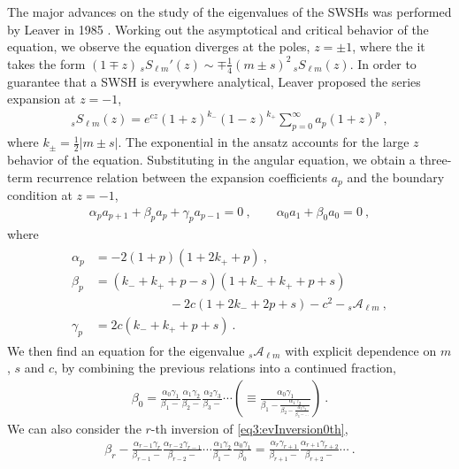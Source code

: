The major advances on the study of the eigenvalues of the SWSHs was performed by Leaver in 1985 . Working out the asymptotical and critical behavior of the equation, we observe the equation diverges at the poles, $z = \pm 1$, where the it takes the form $(1 \mp z) \,{}_{s}S_{\ell m}{}'(z) \sim \mp \tfrac{1}{4} (m \pm s)^2 \, {}_{s}S_{\ell m}(z)$. In order to guarantee that a SWSH is everywhere analytical, Leaver proposed the series expansion at $z=-1$,
\begin{align}
    \label{eq3:SWSHseriesLeaver}
    {}_{s}S_{\ell m}(z) = e^{c z} (1+z)^{k_-} (1-z)^{k_+} \sum_{p=0}^\infty a_p (1+z)^p ~,
\end{align}
where $k_{\pm} = \tfrac{1}{2}|m \pm s|$.
The exponential in the ansatz accounts for the large $z$ behavior of the equation.
Substituting in the angular equation, we obtain a three-term recurrence relation between the expansion coefficients $a_p$ and the boundary condition at $z=-1$,
\begin{align}
    \label{eq3:ap3CoefRecursion}
    \alpha_p a_{p+1} + \beta_p a_p + \gamma_p a_{p-1} = 0 ~,\qquad
    \alpha_0 a_1 + \beta_0 a_0 = 0 ~,
\end{align}
where
\begin{align}
    \label{eq3:LeaverCoefRecursion}
    \begin{split}
        \alpha_p &= -2 (1 + p) (1 + 2 k_{+} + p) ~,\\
        \beta_p  &= (k_{-} + k_{+} + p - s) (1 + k_{-} + k_{+} + p + s) \\
        &\qquad\qquad\qquad - 2 c (1 + 2 k_{-} + 2 p + s) - c^2 - {}_{s}\mathscr{A}_{\ell m} ~,\\
        \gamma_p &= 2 c (k_{-} + k_{+} + p + s) ~.
    \end{split}
\end{align}
We then find an equation for the eigenvalue ${}_{s}\mathscr{A}_{\ell m}$ with explicit dependence on $m$, $s$ and $c$, by combining the previous relations into a continued fraction,
\begin{align}
    \label{eq3:evInversion0th}
    \beta_0 = \frac{\alpha_0 \gamma_1}{\beta_1 -} \frac{\alpha_1 \gamma_2}{\beta_2 -} \frac{\alpha_2 \gamma_3}{\beta_3 -} \cdots \left( \equiv  \frac{\alpha_0 \gamma_1}{\beta_1 - \frac{\alpha_1 \gamma_2}{\beta_2 - \frac{\alpha_2 \gamma_3}{\beta_3 - \dots}}} \right)  ~.
\end{align}
We can also consider the $r$-th inversion of \eqref{eq3:evInversion0th},
\begin{align}
    \label{eq3:evInversionRth}
    \beta_r - \frac{\alpha_{r-1} \gamma_r}{\beta_{r-1} -} \frac{\alpha_{r-2} \gamma_{r-1}}{\beta_{r-2} -} \cdots \frac{\alpha_{1} \gamma_2}{\beta_{1} -} \frac{\alpha_{0} \gamma_{1}}{\beta_{0}} = \frac{\alpha_{r} \gamma_{r+1}}{\beta_{r+1} -} \frac{\alpha_{r+1} \gamma_{r+2}}{\beta_{r+2} -} \cdots ~.
\end{align}
